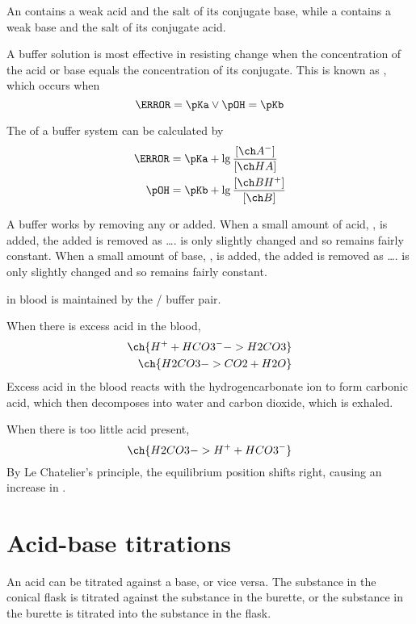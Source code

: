 \documentclass[Chemistry.tex]{subfiles}
\begin{document}
An  contains a weak acid and the salt of its conjugate base, while a  contains a weak base and the salt of its conjugate acid.

A buffer solution is most effective in resisting \pH{} change when the concentration of the acid or base equals the concentration of its conjugate. This is known as , which occurs when \[\pH = \pKa \vee \pOH = \pKb\]

The \pH{} of a buffer system can be calculated by \begin{align}\pH &= \pKa + \lg\frac{\conc{A^-}}{\conc{HA}}\\\pOH &= \pKb + \lg\frac{\conc{BH^+}}{\conc{B}}\end{align}

A buffer works by removing any  or  added. When a small amount of acid, , is added, the added  is removed as \ldots{}.  is only slightly changed and so \pH{} remains fairly constant. When a small amount of base, , is added, the added  is removed as \ldots{}.  is only slightly changed and so \pH{} remains fairly constant.

\pH{} in blood is maintained by the / buffer pair.

When there is excess acid in the blood, \begin{equation}\begin{split}\ch{H^+ + HCO3^- -> H2CO3}\\\ch{H2CO3 -> CO2 + H2O}\end{split}\end{equation} Excess acid in the blood reacts with the hydrogencarbonate ion to form carbonic acid, which then decomposes into water and carbon dioxide, which is exhaled.

When there is too little acid present, \begin{equation}\ch{H2CO3 -> H^+ + HCO3^-}\end{equation} By Le Chatelier's principle, the equilibrium position shifts right, causing an increase in .
\section{Acid-base titrations}
An acid can be titrated against a base, or vice versa. The substance in the conical flask is titrated against the substance in the burette, or the substance in the burette is titrated into the substance in the flask.
\end{document}
